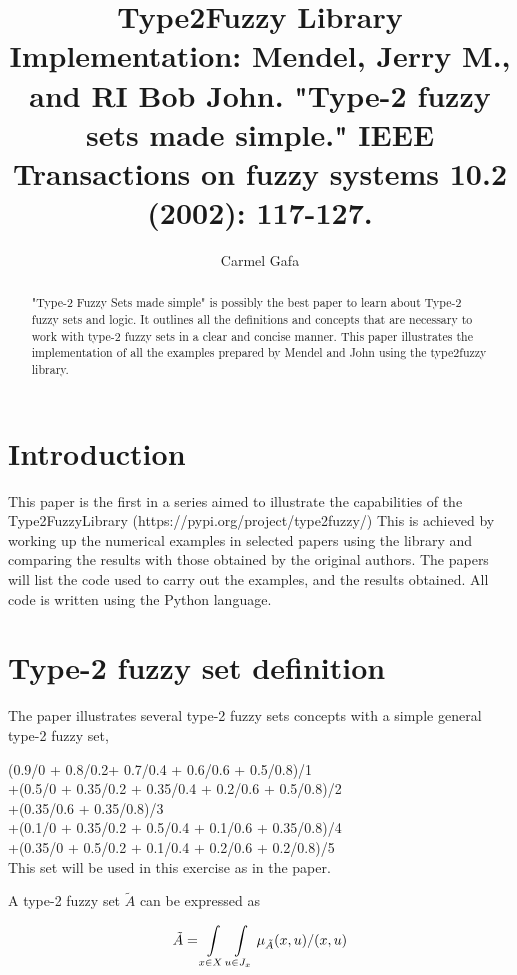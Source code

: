 \documentclass[]{article}
\title{Type2Fuzzy Library Implementation: Mendel, Jerry M., and RI Bob John. "Type-2 fuzzy sets made simple." IEEE Transactions on fuzzy systems 10.2 (2002): 117-127.}
\author{Carmel Gafa}
\begin{document}
\maketitle

\begin{abstract}
"Type-2 Fuzzy Sets made simple" is possibly the best paper to learn about Type-2 fuzzy sets and logic. It outlines all the definitions and concepts that are necessary to work with type-2 fuzzy sets in a clear and concise manner. This paper illustrates the implementation of all the examples prepared by Mendel and John using the type2fuzzy library.
\end{abstract}

\section{Introduction}
This paper is the first in a series aimed to illustrate the capabilities of the Type2FuzzyLibrary (https://pypi.org/project/type2fuzzy/) This is achieved by working up the numerical examples in selected papers using the library and comparing the results with those obtained by the original authors. The papers will list the code used to carry out the examples, and the results obtained. All code is written using the Python language.


\section{Type-2 fuzzy set definition}

The paper illustrates several type-2 fuzzy sets concepts with a simple general type-2 fuzzy set,

\bigskip

{\small (0.9/0 + 0.8/0.2+ 0.7/0.4 + 0.6/0.6 + 0.5/0.8)/1}\\
{\small +(0.5/0 + 0.35/0.2 + 0.35/0.4 + 0.2/0.6 + 0.5/0.8)/2}\\
{\small +(0.35/0.6 + 0.35/0.8)/3}\\
{\small +(0.1/0 + 0.35/0.2 + 0.5/0.4 + 0.1/0.6 + 0.35/0.8)/4}\\
{\small +(0.35/0 + 0.5/0.2 + 0.1/0.4 + 0.2/0.6 + 0.2/0.8)/5}\\

This set will be used in this exercise as in the paper.

\bigskip

A type-2 fuzzy set $\tilde{A}$ can be expressed as 

\begin{equation}
\tilde{A}=\int\displaylimits_{x\in X}\int\displaylimits_{u\in J_{x}} \mu_{\tilde{A}}(x,u) \slash (x,u)
\end{equation} 
\end{document}

